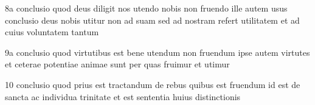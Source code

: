 \documentclass[twoside, openright]{article}
\begin{document}
        \pstart
        8a conclusio quod deus diligit nos utendo nobis non fruendo ille autem usus conclusio deus nobis utitur non ad suam sed ad nostram refert utilitatem et ad cuius voluntatem tantum
        \pend
     
        \pstart
        9a conclusio quod virtutibus est bene utendum non fruendum ipse autem virtutes et ceterae potentiae animae sunt per quas fruimur et utimur
        \pend
     
        \pstart
        10 conclusio quod prius est tractandum de rebus quibus est fruendum id est de sancta ac individua trinitate et est sententia huius distinctionis
        \pend
     
        \endnumbering
        
     
        
\end{document}
